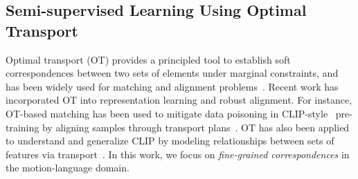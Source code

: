 \subsection{Semi-supervised Learning Using Optimal Transport}
Optimal transport (OT) provides a principled tool to establish soft correspondences between two sets of elements under marginal constraints, and has been widely used for matching and alignment problems~\cite{solomon2018optimal,peyre2019computational,cuturi2013sinkhorn}. Recent work has incorporated OT into representation learning and robust alignment.
For instance, OT-based matching has been used to mitigate data poisoning in CLIP-style~\cite{radford2021learning} pre-training by aligning samples through transport plans~\cite{zhang2025pre}.
OT has also been applied to understand and generalize CLIP by modeling relationships between sets of features via transport~\cite{shi2024ot, yao2021filip}. In this work, we focus on \emph{fine-grained correspondences} in the motion-language domain.